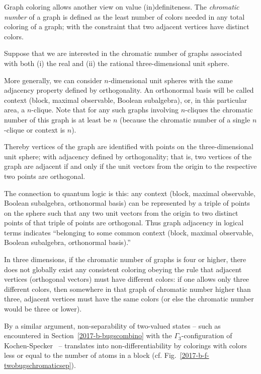 \documentclass[%
  twocolumn,
 showpacs,
 showkeys,
 preprintnumbers,
 amsmath,amssymb,
 aps,
  pra,
  longbibliography,
 floatfix,
 ]{revtex4-1}
\begin{document}
Graph coloring allows another view on value (in)definiteness.
The {\em chromatic number} of a graph
is defined as the least number of colors needed in any total coloring of a graph;
with the constraint that two adjacent vertices have distinct colors.

Suppose that we are interested in the chromatic number of graphs associated with
both (i) the real and (ii) the rational three-dimensional unit sphere.

More generally, we can consider $n$-dimensional unit spheres with the same adjacency property defined by orthogonality.
An orthonormal basis will be called context (block, maximal observable, Boolean subalgebra),
or, in this particular area, a $n$-clique.
Note that for any such graphs involving $n$-cliques the chromatic number of this graph is at least be $n$
(because the chromatic number of a single $n$-clique or context is $n$).

Thereby vertices of the graph are identified with points on the three-dimensional unit sphere;
with adjacency  defined by orthogonality; that is,
two vertices of the graph are adjacent if and only if the unit vectors from the origin
to the respective two points are orthogonal.

The connection to quantum logic is this: any context
(block, maximal observable, Boolean subalgebra, orthonormal basis)
can be represented by a triple of points on the sphere
such that any two unit vectors from the origin
to two distinct points of that triple of points are orthogonal.
Thus graph adjacency in logical terms indicates
``belonging to some common context (block, maximal observable, Boolean subalgebra, orthonormal basis).''

In three dimensions, if the chromatic number of  graphs is four or higher,
there does not globally exist any consistent
coloring obeying the rule that adjacent vertices (orthogonal vectors)
must have different colors: if one allows only three different colors,
then somewhere in that graph of chromatic number higher than three, adjacent vertices must have the same colors
(or else the chromatic number would be three or lower).


By a similar argument, non-separability of two-valued states
--
such as encountered in Section~\ref{2017-b-bugscombino}
with the $\Gamma_3$-configuration of Kochen-Specker~\cite[p.~70]{kochen1}
-- translates into non-differentiability by colorings
with colors less or equal to the number of atoms in a block
(cf. Fig.~\ref{2017-b-f-twobugschromaticsep}).
\end{document}
